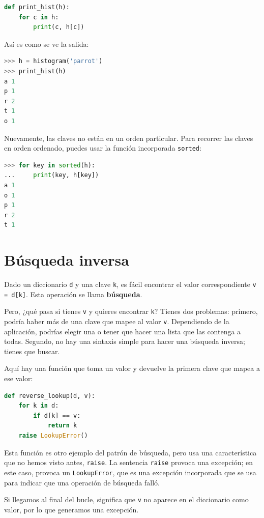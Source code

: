 \begin{lstlisting}[language=Python]
def print_hist(h):
    for c in h:
        print(c, h[c])
\end{lstlisting}

Así es como se ve la salida:

\begin{lstlisting}[language=Python]
>>> h = histogram('parrot')
>>> print_hist(h)
a 1
p 1
r 2
t 1
o 1
\end{lstlisting}

Nuevamente, las claves no están en un orden particular. Para recorrer las claves en orden ordenado, puedes usar la función incorporada \texttt{sorted}:

\begin{lstlisting}[language=Python]
>>> for key in sorted(h):
...     print(key, h[key])
a 1
o 1
p 1
r 2
t 1
\end{lstlisting}

\section{Búsqueda inversa}

Dado un diccionario \texttt{d} y una clave \texttt{k}, es fácil encontrar el valor correspondiente \texttt{v = d[k]}. Esta operación se llama \textbf{búsqueda}.

Pero, ¿qué pasa si tienes \texttt{v} y quieres encontrar \texttt{k}? Tienes dos problemas: primero, podría haber más de una clave que mapee al valor \texttt{v}. Dependiendo de la aplicación, podrías elegir una o tener que hacer una lista que las contenga a todas. Segundo, no hay una sintaxis simple para hacer una búsqueda inversa; tienes que buscar.

Aquí hay una función que toma un valor y devuelve la primera clave que mapea a ese valor:

\begin{lstlisting}[language=Python]
def reverse_lookup(d, v):
    for k in d:
        if d[k] == v:
            return k
    raise LookupError()
\end{lstlisting}

Esta función es otro ejemplo del patrón de búsqueda, pero usa una característica que no hemos visto antes, \texttt{raise}. La sentencia \texttt{raise} provoca una excepción; en este caso, provoca un \texttt{LookupError}, que es una excepción incorporada que se usa para indicar que una operación de búsqueda falló.

Si llegamos al final del bucle, significa que \texttt{v} no aparece en el diccionario como valor, por lo que generamos una excepción.

